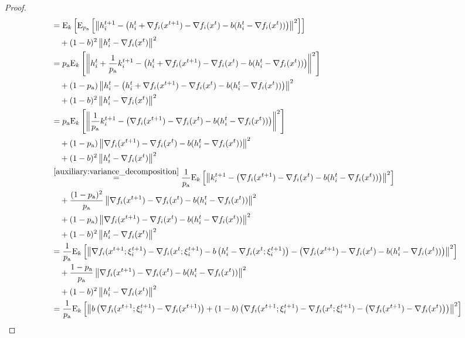 \documentclass{article}
\newcommand*{\probavailable}{\ensuremath{p_{\textnormal{a}}}}
\begin{document}
\begin{proof}
\begin{align*}
    &=\ExpSub{k}{\ExpSub{\probavailable}{\norm{h^{t+1}_i - \left(h^{t}_i + \nabla f_i(x^{t+1}) - \nabla f_i(x^{t}) - b(h^t_i - \nabla f_i(x^{t}))\right)}^2}} \\
    &\quad + (1 - b)^2\norm{h^t_i - \nabla f_i(x^{t})}^2 \\
    &=\probavailable \ExpSub{k}{\norm{h^{t}_i + \frac{1}{\probavailable}k^{t+1}_i - \left(h^{t}_i + \nabla f_i(x^{t+1}) - \nabla f_i(x^{t}) - b(h^t_i - \nabla f_i(x^{t}))\right)}^2} \\
    &\quad + (1 - \probavailable)\norm{h^{t}_i - \left(h^{t}_i + \nabla f_i(x^{t+1}) - \nabla f_i(x^{t}) - b(h^t_i - \nabla f_i(x^{t}))\right)}^2 \\
    &\quad + (1 - b)^2\norm{h^t_i - \nabla f_i(x^{t})}^2 \\
    &=\probavailable \ExpSub{k}{\norm{\frac{1}{\probavailable}k^{t+1}_i - \left(\nabla f_i(x^{t+1}) - \nabla f_i(x^{t}) - b(h^t_i - \nabla f_i(x^{t}))\right)}^2} \\
    &\quad + (1 - \probavailable)\norm{\nabla f_i(x^{t+1}) - \nabla f_i(x^{t}) - b(h^t_i - \nabla f_i(x^{t}))}^2 \\
    &\quad + (1 - b)^2\norm{h^t_i - \nabla f_i(x^{t})}^2 \\
    &\overset{\eqref{auxiliary:variance_decomposition}}{=}\frac{1}{\probavailable} \ExpSub{k}{\norm{k^{t+1}_i - \left(\nabla f_i(x^{t+1}) - \nabla f_i(x^{t}) - b(h^t_i - \nabla f_i(x^{t}))\right)}^2} \\
    &\quad + \frac{(1 - \probavailable)^2}{\probavailable} \norm{\nabla f_i(x^{t+1}) - \nabla f_i(x^{t}) - b(h^t_i - \nabla f_i(x^{t}))}^2 \\
    &\quad + (1 - \probavailable)\norm{\nabla f_i(x^{t+1}) - \nabla f_i(x^{t}) - b(h^t_i - \nabla f_i(x^{t}))}^2 \\
    &\quad + (1 - b)^2\norm{h^t_i - \nabla f_i(x^{t})}^2 \\
    &=\frac{1}{\probavailable} \ExpSub{k}{\norm{\nabla f_i(x^{t+1};\xi^{t+1}_{i}) - \nabla f_i(x^{t};\xi^{t+1}_{i}) - b \left(h^t_i - \nabla f_i(x^{t};\xi^{t+1}_{i})\right) - \left(\nabla f_i(x^{t+1}) - \nabla f_i(x^{t}) - b(h^t_i - \nabla f_i(x^{t}))\right)}^2} \\
    &\quad + \frac{1 - \probavailable}{\probavailable} \norm{\nabla f_i(x^{t+1}) - \nabla f_i(x^{t}) - b(h^t_i - \nabla f_i(x^{t}))}^2 \\
    &\quad + (1 - b)^2\norm{h^t_i - \nabla f_i(x^{t})}^2 \\
    &=\frac{1}{\probavailable} \ExpSub{k}{\norm{b \left(\nabla f_i(x^{t+1};\xi^{t+1}_{i}) - \nabla f_i(x^{t+1})\right) + (1 - b) \left(\nabla f_i(x^{t+1};\xi^{t+1}_{i}) - \nabla f_i(x^{t};\xi^{t+1}_{i}) - \left(\nabla f_i(x^{t+1}) - \nabla f_i(x^{t})\right)\right)}^2} \\

\end{align*}
\end{proof}
\end{document}
